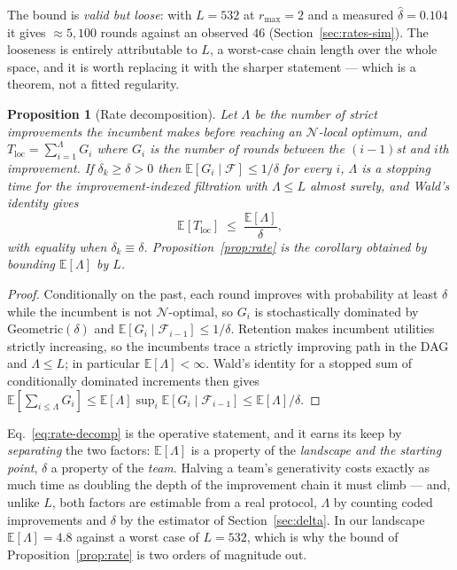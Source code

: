 \documentclass[11pt]{article}
\newtheorem{proposition}{Proposition}
\newcommand{\E}{\mathbb{E}}
\newcommand{\filt}{\mathcal{F}}     %
\begin{document}
\noindent The bound is \emph{valid but loose}: with $L=532$ at $r_{\max}=2$ and a measured $\hat\delta=0.104$ it gives $\approx5{,}100$ rounds against an observed $46$ (Section~\ref{sec:rates-sim}). The looseness is entirely attributable to $L$, a worst-case chain length over the whole space, and it is worth replacing it with the sharper statement --- which is a theorem, not a fitted regularity.

\begin{proposition}[Rate decomposition]
\label{prop:decomp}
Let $\Lambda$ be the number of strict improvements the incumbent makes before reaching an $\mathcal{N}$-local optimum, and $T_{\mathrm{loc}}=\sum_{i=1}^{\Lambda}G_i$ where $G_i$ is the number of rounds between the $(i-1)$st and $i$th improvement. If $\delta_k\ge\delta>0$ then $\E[G_i\mid\filt]\le 1/\delta$ for every $i$, $\Lambda$ is a stopping time for the improvement-indexed filtration with $\Lambda\le L$ almost surely, and Wald's identity gives
\begin{equation}
\label{eq:rate-decomp}
\E[T_{\mathrm{loc}}]\;\le\;\frac{\E[\Lambda]}{\delta},
\end{equation}
with equality when $\delta_k\equiv\delta$. Proposition~\ref{prop:rate} is the corollary obtained by bounding $\E[\Lambda]$ by $L$.
\end{proposition}
\begin{proof}
Conditionally on the past, each round improves with probability at least $\delta$ while the incumbent is not $\mathcal{N}$-optimal, so $G_i$ is stochastically dominated by $\mathrm{Geometric}(\delta)$ and $\E[G_i\mid\filt_{i-1}]\le1/\delta$. Retention makes incumbent utilities strictly increasing, so the incumbents trace a strictly improving path in the DAG and $\Lambda\le L$; in particular $\E[\Lambda]<\infty$. Wald's identity for a stopped sum of conditionally dominated increments then gives $\E[\sum_{i\le\Lambda}G_i]\le\E[\Lambda]\sup_i\E[G_i\mid\filt_{i-1}]\le\E[\Lambda]/\delta$.
\end{proof}

\noindent Eq.~\eqref{eq:rate-decomp} is the operative statement, and it earns its keep by \emph{separating} the two factors: $\E[\Lambda]$ is a property of the \emph{landscape and the starting point}, $\delta$ a property of the \emph{team}. Halving a team's generativity costs exactly as much time as doubling the depth of the improvement chain it must climb --- and, unlike $L$, both factors are estimable from a real protocol, $\Lambda$ by counting coded improvements and $\delta$ by the estimator of Section~\ref{sec:delta}. In our landscape $\E[\Lambda]=4.8$ against a worst case of $L=532$, which is why the bound of Proposition~\ref{prop:rate} is two orders of magnitude out.
\end{document}
